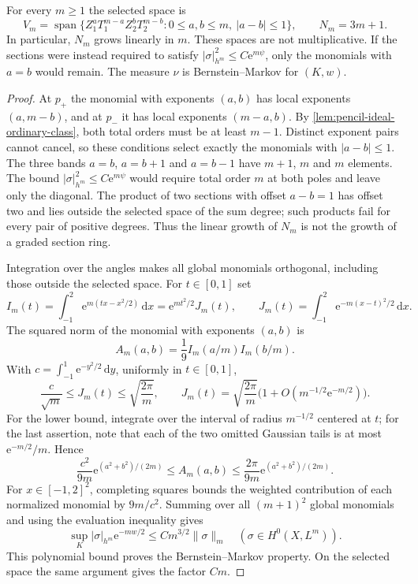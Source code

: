 \begin{proposition}\label{prop:pencil-three-band-space}
For every $m\geq1$ the selected space is
\[
 V_m=\operatorname{span}\{Z_1^aT_1^{m-a}Z_2^bT_2^{m-b}:
              0\leq a,b\leq m,\ |a-b|\leq1\},
 \qquad N_m=3m+1.
\]
In particular, $N_m$ grows linearly in $m$. These spaces are not multiplicative. If the sections were instead required to satisfy $|\sigma|_{h^m}^2\leq C\mathrm e^{m\psi}$, only the monomials with $a=b$ would remain. The measure $\nu$ is Bernstein--Markov for $(K,w)$.
\end{proposition}
\begin{proof}
At $p_+$ the monomial with exponents $(a,b)$ has local exponents $(a,m-b)$, and at $p_-$ it has local exponents $(m-a,b)$. By \cref{lem:pencil-ideal-ordinary-class}, both total orders must be at least $m-1$. Distinct exponent pairs cannot cancel, so these conditions select exactly the monomials with $|a-b|\leq1$. The three bands $a=b$, $a=b+1$ and $a=b-1$ have $m+1$, $m$ and $m$ elements. The bound $|\sigma|_{h^m}^2\leq C\mathrm e^{m\psi}$ would require total order $m$ at both poles and leave only the diagonal. The product of two sections with offset $a-b=1$ has offset two and lies outside the selected space of the sum degree; such products fail for every pair of positive degrees. Thus the linear growth of $N_m$ is not the growth of a graded section ring.

Integration over the angles makes all global monomials orthogonal, including those outside the selected space. For $t\in[0,1]$ set
\[
 I_m(t)=\int_{-1}^2\mathrm e^{m(tx-x^2/2)}\,\mathrm dx
       =\mathrm e^{mt^2/2}J_m(t),\qquad
 J_m(t)=\int_{-1}^2\mathrm e^{-m(x-t)^2/2}\,\mathrm dx.
\]
The squared norm of the monomial with exponents $(a,b)$ is
\begin{equation}\label{eq:pencil-gaussian-norm}
 A_m(a,b)=\frac19 I_m(a/m)I_m(b/m).
\end{equation}
With $c=\int_{-1}^1\mathrm e^{-y^2/2}\,\mathrm dy$, uniformly in $t\in[0,1]$,
\[
 \frac c{\sqrt m}\leq J_m(t)\leq\sqrt{\frac{2\pi}m},\qquad
 J_m(t)=\sqrt{\frac{2\pi}m}
                  \bigl(1+O(m^{-1/2}\mathrm e^{-m/2})\bigr).
\]
For the lower bound, integrate over the interval of radius $m^{-1/2}$ centered at $t$; for the last assertion, note that each of the two omitted Gaussian tails is at most $\mathrm e^{-m/2}/m$. Hence
\begin{equation}\label{eq:pencil-gaussian-norm-bounds}
 \frac{c^2}{9m}\mathrm e^{(a^2+b^2)/(2m)}
 \leq A_m(a,b)\leq\frac{2\pi}{9m}\mathrm e^{(a^2+b^2)/(2m)}.
\end{equation}
For $x\in[-1,2]^2$, completing squares bounds the weighted contribution of each normalized monomial by $9m/c^2$. Summing over all $(m+1)^2$ global monomials and using the evaluation inequality gives
\[
 \sup_K|\sigma|_{h^m}\mathrm e^{-mw/2}
       \leq C m^{3/2}\|\sigma\|_m
       \quad(\sigma\in H^0(X,L^m)).
\]
This polynomial bound proves the Bernstein--Markov property. On the selected space the same argument gives the factor $Cm$.
\end{proof}

